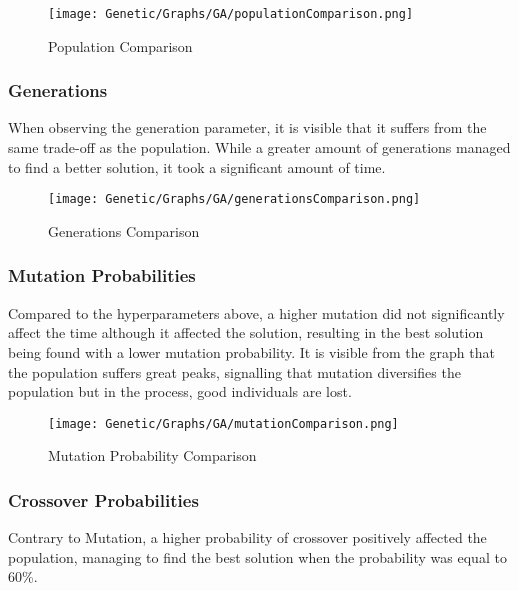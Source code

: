 \documentclass{report}
\begin{document}
\begin{center}
\begin{figure}[htp]
\texttt{[image: Genetic/Graphs/GA/populationComparison.png]}
\caption{Population Comparison}
\label{populations}
\end{figure}
\end{center}

\newpage
\subsubsection{Generations}
When observing the generation parameter, it is visible that it suffers from the same trade-off as the population. While a greater amount of generations managed to find a better solution, it took a significant amount of time. 

\begin{center}
\begin{figure}[htp]
\texttt{[image: Genetic/Graphs/GA/generationsComparison.png]}
\caption{Generations Comparison}
\label{generations}
\end{figure}
\end{center}

\newpage
\subsubsection{Mutation Probabilities}

Compared to the hyperparameters above, a higher mutation did not significantly affect the time although it affected the solution, resulting in the best solution being found with a lower mutation probability. It is visible from the graph that the population suffers great peaks, signalling that mutation diversifies the population but in the process, good individuals are lost. 

\begin{center}
\begin{figure}[htp]
\texttt{[image: Genetic/Graphs/GA/mutationComparison.png]}
\caption{Mutation Probability Comparison}
\label{mutation}
\end{figure}
\end{center}

\newpage
\subsubsection{Crossover Probabilities}

Contrary to Mutation, a higher probability of crossover positively affected the population, managing to find the best solution when the probability was equal to 60\%.
\end{document}
